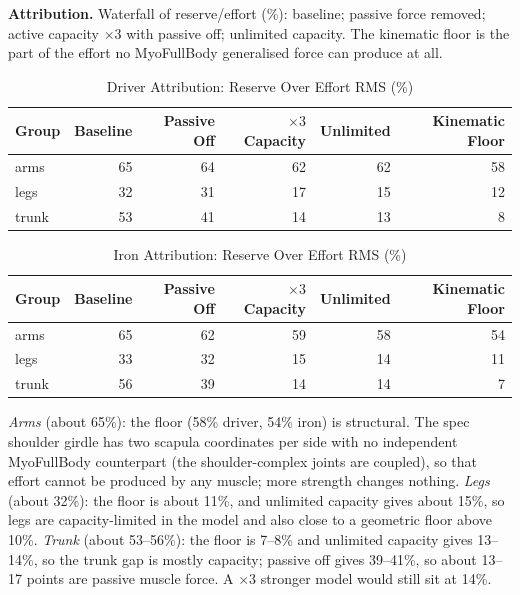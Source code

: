 \documentclass[11pt,a4paper]{article}
\begin{document}
\textbf{Attribution.} Waterfall of reserve/effort (\%): baseline; passive force removed; active capacity $\times3$ with passive off; unlimited capacity. The kinematic floor is the part of the effort no MyoFullBody generalised force can produce at all.

\begin{table}[h]\centering\small
\caption{Driver Attribution: Reserve Over Effort RMS (\%)}
\begin{tabular}{lrrrrr}\toprule Group & Baseline & Passive Off & $\times3$ Capacity & Unlimited & Kinematic Floor \\\midrule
arms & 65 & 64 & 62 & 62 & 58 \\
legs & 32 & 31 & 17 & 15 & 12 \\
trunk & 53 & 41 & 14 & 13 & 8 \\
\bottomrule\end{tabular}\end{table}

\begin{table}[h]\centering\small
\caption{Iron Attribution: Reserve Over Effort RMS (\%)}
\begin{tabular}{lrrrrr}\toprule Group & Baseline & Passive Off & $\times3$ Capacity & Unlimited & Kinematic Floor \\\midrule
arms & 65 & 62 & 59 & 58 & 54 \\
legs & 33 & 32 & 15 & 14 & 11 \\
trunk & 56 & 39 & 14 & 14 & 7 \\
\bottomrule\end{tabular}\end{table}

\noindent \emph{Arms} (about 65\%): the floor (58\% driver, 54\% iron) is structural. The spec shoulder girdle has two scapula coordinates per side with no independent MyoFullBody counterpart (the shoulder-complex joints are coupled), so that effort cannot be produced by any muscle; more strength changes nothing. \emph{Legs} (about 32\%): the floor is about 11\%, and unlimited capacity gives about 15\%, so legs are capacity-limited in the model and also close to a geometric floor above 10\%. \emph{Trunk} (about 53--56\%): the floor is 7--8\% and unlimited capacity gives 13--14\%, so the trunk gap is mostly capacity; passive off gives 39--41\%, so about 13--17 points are passive muscle force. A $\times3$ stronger model would still sit at 14\%.
\end{document}
